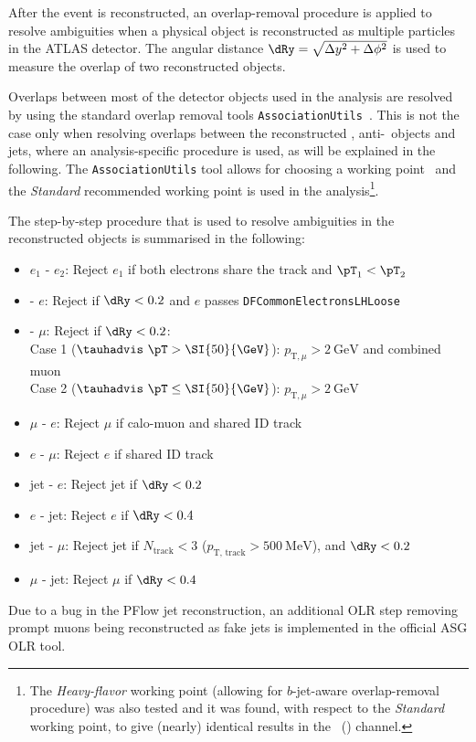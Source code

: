 After the event is reconstructed, an overlap-removal procedure is applied to
resolve ambiguities when a physical object is reconstructed as multiple
particles in the ATLAS detector. The angular distance $\dRy =
\sqrt{\Delta y^2 + \Delta \phi^2}$ is used to measure the overlap of two
reconstructed objects.

Overlaps between most of the detector objects used in the analysis are resolved by using 
the standard overlap removal tools \verb|AssociationUtils|~\cite{olrAssociationUtils}. This is not
the case only when resolving overlaps between the reconstructed \tauhadvis, anti-\tauhadvis\ objects and jets,
where an analysis-specific procedure is used, as will be explained in the following.
The \verb|AssociationUtils| tool allows for choosing a working point~\cite{olrWorkingPoints} and
the \textit{Standard} recommended working point is used in the analysis\footnote{The 
\textit{Heavy-flavor} working point (allowing for $b$-jet-aware overlap-removal procedure)  
was also tested and it was found, with respect to the \textit{Standard} working point, 
to give (nearly) identical results in the \hadhad\ (\lephad) channel.}.

The step-by-step procedure that is used to resolve ambiguities in the
reconstructed objects is summarised in the following:
\begin{itemize}
\item $e_1$ - $e_2$: Reject $e_1$ if both electrons share the track and ${\pT}_1
  < {\pT}_2$
\item \tauhadvis - $e$: Reject \tauhadvis if $\dRy < 0.2$ and $e$ passes \verb|DFCommonElectronsLHLoose|
\item \tauhadvis - $\mu$: Reject \tauhadvis if $\dRy < 0.2$:\\
  Case 1 ($\tauhadvis\ \pT > \SI{50}{\GeV}$): $p_{\text{T}, \mu} > \SI{2}{\GeV}$
  and combined muon\\
  Case 2 ($\tauhadvis\ \pT \leq \SI{50}{\GeV}$): $p_{\text{T}, \mu} > \SI{2}{\GeV}$
  \item $\mu$ - $e$: Reject $\mu$ if calo-muon and shared ID track
\item $e$ - $\mu$: Reject $e$ if shared ID track
\item jet - $e$: Reject jet if $\dRy < 0.2$
\item $e$ - jet: Reject $e$ if $\dRy < 0.4$
\item jet - $\mu$: Reject jet if $N_\text{track} < 3$ ($p_\text{T,
  track} > \SI{500}{\MeV}$), and $\dRy < 0.2$
\item $\mu$ - jet: Reject $\mu$ if $\dRy < 0.4$
\end{itemize}
Due to a bug in the PFlow jet reconstruction, an additional OLR step removing
prompt muons being reconstructed as fake jets is implemented in the official ASG
OLR tool.


